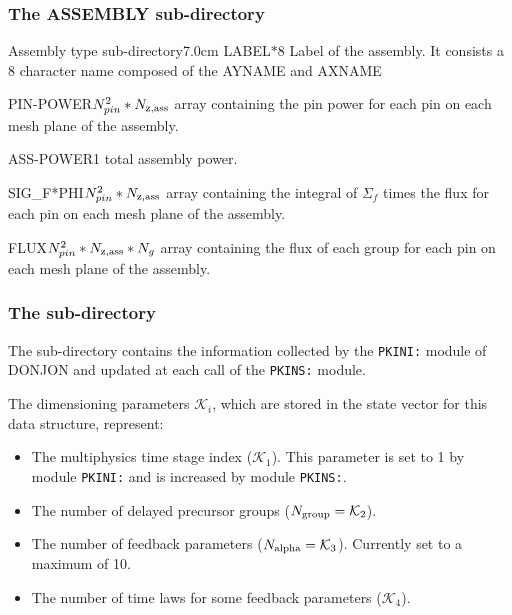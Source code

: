 \subsubsection{The ASSEMBLY sub-directory}\label{sect:fmapdirass}

\begin{DescriptionEnregistrement}{Assembly type sub-directory}{7.0cm}
\CharEnr
  {LABEL}{$*8$}
  {Label of the assembly. It consists a 8 character name composed of the AYNAME and AXNAME}

\RealEnr
  {PIN-POWER}{$N_{pin}^2*N_{\rm z,ass}$}{}
  {array containing the pin power for each pin on each mesh plane of the assembly.}

\RealEnr
  {ASS-POWER}{1}{}
  {total assembly power.}

\RealEnr
  {SIG\_F*PHI}{$N_{pin}^2*N_{\rm z,ass}$}{}
  {array containing the integral of $\Sigma_f$  times the flux for each pin on each mesh plane of the assembly.}

\RealEnr
  {FLUX}{$N_{pin}^2*N_{\rm z,ass}*N_g$}{}
  {array containing the flux of each group for each pin on each mesh plane of the assembly.}

\end{DescriptionEnregistrement}

\subsubsection{The  sub-directory}\label{sect:pkinetics}

The  sub-directory contains the information collected by the {\tt PKINI:} module of DONJON and updated at
each call of the {\tt PKINS:} module.

\vskip 0.08cm

The dimensioning parameters $\mathcal{K}_i$, which are stored in the state vector for this data structure, represent:

\begin{itemize}

\item The multiphysics time stage index ($\mathcal{K}_1$). This parameter is set to 1 by module {\tt PKINI:} and is
increased by module {\tt PKINS:}.

\item The number of delayed precursor groups ($N_{\rm group}=\mathcal{K}_2$).

\item The number of feedback parameters ($N_{\rm alpha}=\mathcal{K}_3$). Currently set to a maximum of 10.

\item The number of time laws for some feedback parameters ($\mathcal{K}_4$).

\end{itemize}


